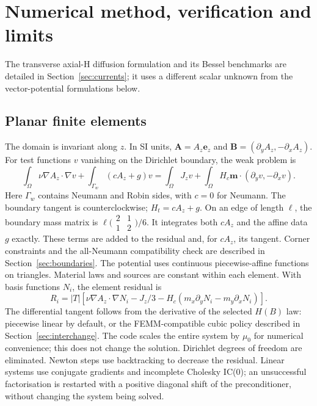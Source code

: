\section{Numerical method, verification and limits}
\label{sec:numerics}
The transverse axial-H diffusion formulation and its Bessel benchmarks are
detailed in Section~\ref{sec:currents}; it uses a different scalar unknown
from the vector-potential formulations below.

\subsection{Planar finite elements}
The domain is invariant along $z$. In SI units,
$\mathbf A=A_z\mathbf e_z$ and
$\mathbf B=(\partial_y A_z,-\partial_x A_z)$.
For test functions $v$ vanishing on the Dirichlet boundary, the weak problem is
\[
 \int_\Omega \nu\nabla A_z\cdot\nabla v+\int_{\Gamma_w}(cA_z+g)v
 =\int_\Omega J_zv+
  \int_\Omega H_c\mathbf m\cdot(\partial_yv,-\partial_xv).
\]
Here $\Gamma_w$ contains Neumann and Robin sides, with $c=0$ for Neumann.
The boundary tangent is counterclockwise; $H_t=cA_z+g$. On an edge of
length $\ell$, the boundary mass matrix is
$\ell\bigl(\begin{smallmatrix}2&1\\1&2\end{smallmatrix}\bigr)/6$.
It integrates both $cA_z$ and the affine data $g$ exactly. These terms
are added to the residual and, for $cA_z$, its tangent. Corner constraints
and the all-Neumann compatibility check are described in
Section~\ref{sec:boundaries}.
The potential uses continuous piecewise-affine functions on triangles.
Material laws and sources are constant within each element. With basis
functions $N_i$, the element residual is
\[
 R_i=|T|\left[\nu\nabla A_z\cdot\nabla N_i
 -J_z/3-H_c(m_x\partial_yN_i-m_y\partial_xN_i)\right].
\]
The differential tangent follows from the derivative of the selected
$H(B)$ law: piecewise linear by default, or the FEMM-compatible cubic policy
described in Section~\ref{sec:interchange}. The code scales the entire system by $\mu_0$ for numerical
convenience; this does not change the solution. Dirichlet degrees of
freedom are eliminated. Newton steps use backtracking to decrease the
residual. Linear systems use conjugate gradients and incomplete Cholesky
IC(0); an unsuccessful factorisation is restarted with a positive diagonal
shift of the preconditioner, without changing the system being solved.

